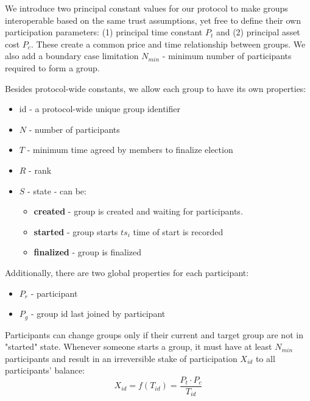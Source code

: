 \documentclass{article}
\begin{document}
\begin{CJK}{UTF8}{gbsn}
    We introduce two principal constant values for our protocol to make groups interoperable based on the same trust assumptions, yet free to define their own participation parameters: (1) principal time constant $P_t$ and (2) principal asset cost $P_c$. These create a common price and time relationship between groups. We also add a boundary case limitation $N_{min}$ - minimum number of participants required to form a group.

    Besides protocol-wide constants, we allow each group to have its own properties:
    \pagebreak
    \begin{itemize}[nosep]
        \item id - a protocol-wide unique group identifier
        \item $N$ - number of participants
        \item $T$ - minimum time agreed by members to finalize election
        \item $R$ - rank
        \item $S$ - state - can be:
              \begin{itemize}[nosep]
                  \item \textbf{created} - group is created and waiting for participants.
                  \item \textbf{started} - group starts $ts_i$ time of start is recorded
                  \item \textbf{finalized} - group is finalized
              \end{itemize}
    \end{itemize}

    Additionally, there are two global properties for each participant:

    \begin{itemize}[nosep]
        \item  $P_r$ - participant
        \item $P_g$ - group id last joined by participant
    \end{itemize}

    Participants can change groups only if their current and target group are not in "started" state. Whenever someone starts a group, it must have at least $N_{min}$ participants and result in an irreversible stake of participation $X_{id}$ to all participants' balance:
    \begin{equation}
        \label{eq:group-fee}
        X_{id} = f(T_{id}) = \dfrac{P_t \cdot  P_c }{T_{id}}
    \end{equation}


\end{CJK}
\end{document}
